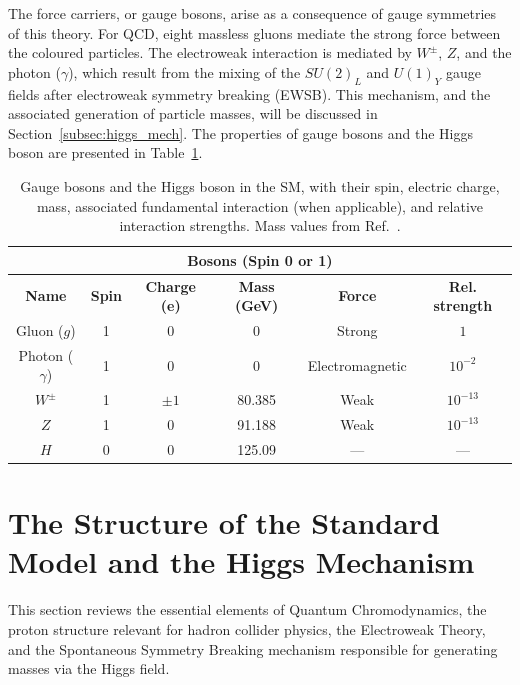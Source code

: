 The force carriers, or gauge bosons, arise as a consequence of gauge symmetries of this theory. For QCD, eight massless gluons mediate the strong force between the coloured particles. The electroweak interaction is mediated by $W^\pm$, $Z$, and the photon ($\gamma$), which result from the mixing of the $SU(2)_L$ and $U(1)_Y$ gauge fields after electroweak symmetry breaking (EWSB). This mechanism, and the associated generation of particle masses, will be discussed in Section~\ref{subsec:higgs_mech}. The properties of gauge bosons and the Higgs boson are presented in Table~\ref{tab:bosons}.
\begin{table}[htbp]
\centering
\caption{Gauge bosons and the Higgs boson in the SM, with their spin, electric charge, mass, associated fundamental interaction (when applicable), and relative interaction strengths. Mass values from Ref.~\cite{PhysRevD.98.030001}.}
\small
\renewcommand{\arraystretch}{1.2}
\setlength{\tabcolsep}{6pt}
\begin{tabular}{cccccc}
\multicolumn{6}{c}{\textbf{Bosons (Spin 0 or 1)}} \\
\toprule
\textbf{Name} & \textbf{Spin} & \textbf{Charge (e)} & \textbf{Mass (GeV)} & \textbf{Force} & \textbf{Rel. strength} \\
\midrule
Gluon ($g$)     & 1 & 0        & 0       & Strong         & $1$ \\
Photon ($\gamma$) & 1 & 0        & 0       & Electromagnetic & $10^{-2}$ \\
$W^{\pm}$       & 1 & $\pm 1$  & 80.385  & Weak           & $10^{-13}$ \\
$Z$             & 1 & 0        & 91.188  & Weak           & $10^{-13}$ \\
$H$             & 0 & 0        & 125.09  & —              & — \\
\bottomrule
\end{tabular}
\label{tab:bosons}
\end{table}



\section{The Structure of the Standard Model and the Higgs Mechanism}
\label{sec:sm_higgs_mech}


This section reviews the essential elements of Quantum Chromodynamics, the proton structure relevant for hadron collider physics, the Electroweak Theory, and the Spontaneous Symmetry Breaking mechanism responsible for generating masses via the Higgs field.


